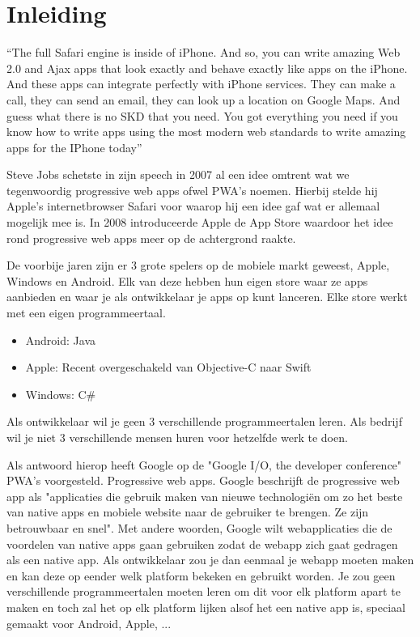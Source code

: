 
\chapter{Inleiding}
\label{ch:inleiding}

“The full Safari engine is inside of iPhone. And so, you can write amazing Web 2.0 and Ajax apps that look exactly and behave exactly like apps on the iPhone. And these apps can integrate perfectly with iPhone services. They can make a call, they can send an email, they can look up a location on Google Maps. And guess what there is no SKD that you need. You got everything you need if you know how to write apps using the most modern web standards to write amazing apps for the IPhone today” ~\autocite{keynote2007}

Steve Jobs schetste in zijn speech in 2007 al een idee omtrent wat we tegenwoordig progressive web apps ofwel PWA's noemen. Hierbij stelde hij Apple's internetbrowser Safari voor waarop hij een idee gaf wat er allemaal mogelijk mee is. In 2008 introduceerde Apple de App Store waardoor het idee rond progressive web apps meer op de achtergrond raakte.

De voorbije jaren zijn er 3 grote spelers op de mobiele markt geweest, Apple, Windows en Android. Elk van deze hebben hun eigen store waar ze apps aanbieden en waar je als ontwikkelaar je apps op kunt lanceren. Elke store werkt met een eigen programmeertaal.
\begin{itemize}  
	\item Android: Java
	\item Apple: Recent overgeschakeld van Objective-C naar Swift
	\item Windows: C\#
\end{itemize}

Als ontwikkelaar wil je geen 3 verschillende programmeertalen leren. Als bedrijf wil je niet 3 verschillende mensen huren voor hetzelfde werk te doen.

Als antwoord hierop heeft Google op de "Google I/O, the developer conference" PWA's voorgesteld. Progressive web apps. Google beschrijft de progressive web app als "applicaties die gebruik maken van nieuwe technologiën om zo het beste van native apps en mobiele website naar de gebruiker te brengen. Ze zijn betrouwbaar en snel".
Met andere woorden, Google wilt webapplicaties die de voordelen van native apps gaan gebruiken zodat de webapp zich gaat gedragen als een native app. 
Als ontwikkelaar zou je dan eenmaal je webapp moeten maken en kan deze op eender welk platform bekeken en gebruikt worden. Je zou geen verschillende programmeertalen moeten leren om dit voor elk platform apart te maken en toch zal het op elk platform lijken alsof het een native app is, speciaal gemaakt voor Android, Apple, ...


